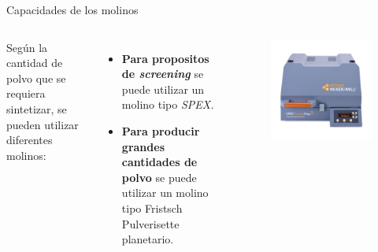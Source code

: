 \documentclass[%
spanish,
progressbar=head,
subsectionpage,
aspectratio=169
]{beamer}
\begin{document}
\begin{frame}{Capacidades de los molinos}
    \begin{columns}
    Según la cantidad de polvo que se requiera sintetizar, se pueden utilizar diferentes molinos:
    \begin{itemize}
        \item<1-> \textbf{Para propositos de \emph{screening}} se puede utilizar un molino tipo \emph{SPEX.}
        \item<2-> \textbf{Para producir grandes cantidades de polvo} se puede utilizar un molino tipo Fristsch Pulverisette planetario.
    \end{itemize}
    
    \begin{figure}
        \begin{center}
        \begin{overprint}
             \includegraphics[height=0.8\pageheight]{figuras/big.png} 

\end{overprint}
\end{center}
\end{figure}
\end{columns}
\end{frame}
\end{document}
